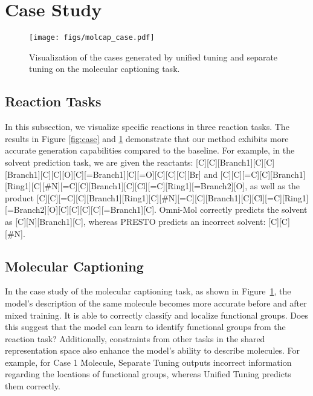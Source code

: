 \section{Case Study}

\begin{figure}[ht]
    \centering
    \texttt{[image: figs/molcap\_case.pdf]}\\[-7pt]
    \caption{Visualization of the cases generated by unified tuning and separate tuning on the molecular captioning task.}
    \label{fig:molcap case}
    \vspace{-0.2cm}
\end{figure}

\subsection{Reaction Tasks}
In this subsection, we visualize specific reactions in three reaction tasks. The results in Figure \ref{fig:case} and \ref{fig:molcap case} demonstrate that our method exhibits more accurate generation capabilities compared to the baseline. For example, in the solvent prediction task, we are given the reactants: [C][C][Branch1][C][C][Branch1][C][C][O][C][=Branch1][C][=O][C][C][C][Br] and [C][C][=C][C][Branch1][Ring1][C][\#N][=C][C][Branch1][C][Cl][=C][Ring1][=Branch2][O], as well as the product [C][C][=C][C][Branch1][Ring1][C][\#N][=C][C][Branch1][C][Cl][=C][Ring1][=Branch2][O][C][C][C][C][=Branch1][C]\-[=O][O][C][Branch1][C][C][Branch1][C][C][C]. Omni-Mol correctly predicts the solvent as [C][N][Branch1][C]\-[C][C][=O], whereas PRESTO predicts an incorrect solvent: [C][C][\#N].

\subsection{Molecular Captioning}
In the case study of the molecular captioning task, as shown in Figure~\ref{fig:molcap case}, the model’s description of the same molecule becomes more accurate before and after mixed training. It is able to correctly classify and localize functional groups. Does this suggest that the model can learn to identify functional groups from the reaction task? Additionally, constraints from other tasks in the shared representation space also enhance the model’s ability to describe molecules. For example, for Case 1 Molecule, Separate Tuning outputs incorrect information regarding the locations of functional groups, whereas Unified Tuning predicts them correctly.

